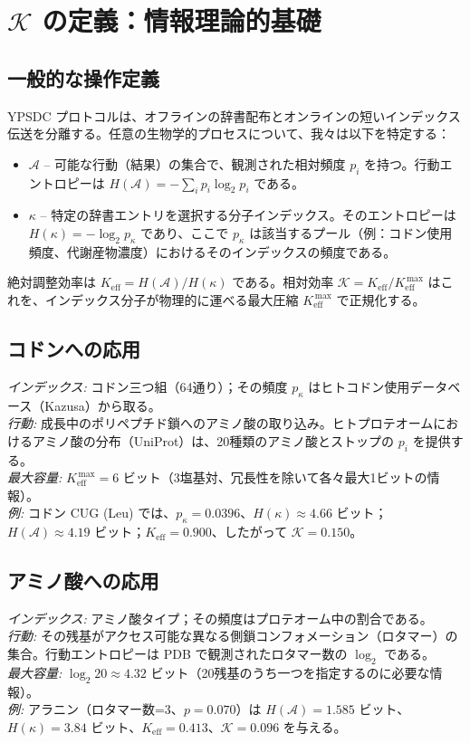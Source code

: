\documentclass[12pt,a4paper]{ltjsarticle}
\newcommand{\REL}{\mathcal{K}}          %
\newcommand{\ABS}{K_{\mathrm{eff}}}     %
\begin{document}
	\section{\(\REL\) の定義：情報理論的基礎}
	\label{sec:REL-def}
	
	\subsection{一般的な操作定義}
	YPSDC プロトコルは、オフラインの辞書配布とオンラインの短いインデックス伝送を分離する。任意の生物学的プロセスについて、我々は以下を特定する：
	\begin{itemize}
		\item \(\mathcal{A}\) – 可能な行動（結果）の集合で、観測された相対頻度 \(p_i\) を持つ。行動エントロピーは \(H(\mathcal{A}) = -\sum_i p_i \log_2 p_i\) である。
		\item \(\kappa\) – 特定の辞書エントリを選択する分子インデックス。そのエントロピーは \(H(\kappa) = -\log_2 p_\kappa\) であり、ここで \(p_\kappa\) は該当するプール（例：コドン使用頻度、代謝産物濃度）におけるそのインデックスの頻度である。
	\end{itemize}
	絶対調整効率は \(\ABS = H(\mathcal{A})/H(\kappa)\) である。相対効率 \(\REL = \ABS / \ABS^{\,\max}\) はこれを、インデックス分子が物理的に運べる最大圧縮 \(\ABS^{\,\max}\) で正規化する。
	
	\subsection{コドンへの応用}
	\textit{インデックス:} コドン三つ組（64通り）；その頻度 \(p_\kappa\) はヒトコドン使用データベース（Kazusa）から取る。\\
	\textit{行動:} 成長中のポリペプチド鎖へのアミノ酸の取り込み。ヒトプロテオームにおけるアミノ酸の分布（UniProt）は、20種類のアミノ酸とストップの \(p_i\) を提供する。\\
	\textit{最大容量:} \(\ABS^{\,\max}=6\) ビット（3塩基対、冗長性を除いて各々最大1ビットの情報）。\\
	\textit{例:} コドン CUG (Leu) では、\(p_\kappa=0.0396\)、\(H(\kappa)\approx4.66\) ビット；\(H(\mathcal{A})\approx4.19\) ビット；\(\ABS=0.900\)、したがって \(\REL=0.150\)。
	
	\subsection{アミノ酸への応用}
	\textit{インデックス:} アミノ酸タイプ；その頻度はプロテオーム中の割合である。\\
	\textit{行動:} その残基がアクセス可能な異なる側鎖コンフォメーション（ロタマー）の集合。行動エントロピーは PDB で観測されたロタマー数の \(\log_2\) である。\\
	\textit{最大容量:} \(\log_2 20 \approx 4.32\) ビット（20残基のうち一つを指定するのに必要な情報）。\\
	\textit{例:} アラニン（ロタマー数=3、\(p=0.070\)）は \(H(\mathcal{A})=1.585\) ビット、\(H(\kappa)=3.84\) ビット、\(\ABS=0.413\)、\(\REL=0.096\) を与える。
	
\end{document}
